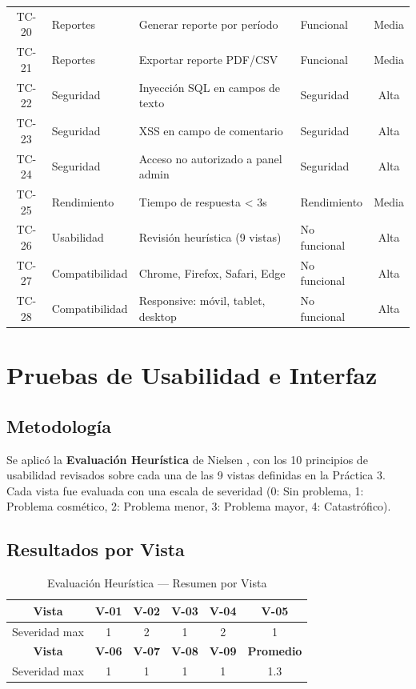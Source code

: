 \begin{table}[H]
\begin{tabular}{|c|l|l|l|c|}
        TC-20 & Reportes & Generar reporte por período & Funcional & Media \\
        TC-21 & Reportes & Exportar reporte PDF/CSV & Funcional & Media \\
        TC-22 & Seguridad & Inyección SQL en campos de texto & Seguridad & Alta \\
        TC-23 & Seguridad & XSS en campo de comentario & Seguridad & Alta \\
        TC-24 & Seguridad & Acceso no autorizado a panel admin & Seguridad & Alta \\
        TC-25 & Rendimiento & Tiempo de respuesta < 3s & Rendimiento & Media \\
        TC-26 & Usabilidad & Revisión heurística (9 vistas) & No funcional & Alta \\
        TC-27 & Compatibilidad & Chrome, Firefox, Safari, Edge & No funcional & Alta \\
        TC-28 & Compatibilidad & Responsive: móvil, tablet, desktop & No funcional & Alta \\
        \hline
    \end{tabular}
\end{table}

\section{Pruebas de Usabilidad e Interfaz}

\subsection{Metodología}
Se aplicó la \textbf{Evaluación Heurística} de Nielsen \cite{Nielsen1994}, con los 10 principios de usabilidad revisados sobre cada una de las 9 vistas definidas en la Práctica 3. Cada vista fue evaluada con una escala de severidad (0: Sin problema, 1: Problema cosmético, 2: Problema menor, 3: Problema mayor, 4: Catastrófico).

\subsection{Resultados por Vista}

\begin{table}[H]
    \centering
    \caption{Evaluación Heurística — Resumen por Vista}
    \label{tab:heuristica}
    \small
    \begin{tabular}{|c|c|c|c|c|c|}
        \hline
        \textbf{Vista} & \textbf{V-01} & \textbf{V-02} & \textbf{V-03} & \textbf{V-04} & \textbf{V-05} \\
        \hline
        Severidad max & 1 & 2 & 1 & 2 & 1 \\
        \hline
        \hline
        \textbf{Vista} & \textbf{V-06} & \textbf{V-07} & \textbf{V-08} & \textbf{V-09} & \textbf{Promedio} \\
        \hline
        Severidad max & 1 & 1 & 1 & 1 & 1.3 \\
        \hline
    \end{tabular}
\end{table}

